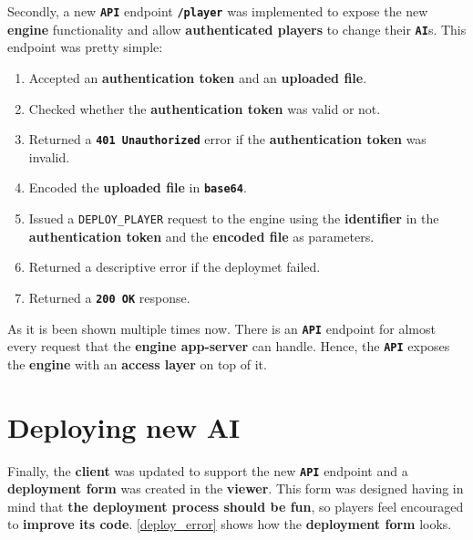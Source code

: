 \documentclass[a4paper,11pt,titlepage,abstract,numbers=noenddot,automark,mnsy,intlimits,rgb,dvipsnames]{report}
\begin{document}
Secondly, a new \textbf{\texttt{API}} endpoint \textbf{\texttt{/player}} was implemented to expose the new \textbf{engine} functionality and
allow \textbf{authenticated players} to change their \textbf{\texttt{AI}}s. This endpoint was pretty simple:
\begin{enumerate}
\item
Accepted an \textbf{authentication token} and an \textbf{uploaded file}.
\item
Checked whether the \textbf{authentication token} was valid or not.
\item
Returned a \textbf{\texttt{401 Unauthorized}} error if the \textbf{authentication token} was invalid.
\item
Encoded the \textbf{uploaded file} in \textbf{\texttt{base64}}.
\item
Issued a \texttt{DEPLOY\_PLAYER} request to the engine using the \textbf{identifier} in the \textbf{authentication token} and the
  \textbf{encoded file} as parameters.
\item
Returned a descriptive error if the deploymet failed.
\item
Returned a \textbf{\texttt{200 OK}} response.
\end{enumerate}
As it is been shown multiple times now. There is an \textbf{\texttt{API}} endpoint for almost every request that the \textbf{engine app-server}
can handle. Hence, the \textbf{\texttt{API}} exposes the \textbf{engine} with an \textbf{access layer} on top of it.
\section{Deploying new AI}
Finally, the \textbf{client} was updated to support the new \textbf{\texttt{API}} endpoint and a \textbf{deployment form} was created in the \textbf{viewer}.
This form was designed having in mind that \textbf{the deployment process should be fun}, so players feel encouraged to
\textbf{improve its code}. \autoref{deploy_error} shows how the \textbf{deployment form} looks.
\end{document}
